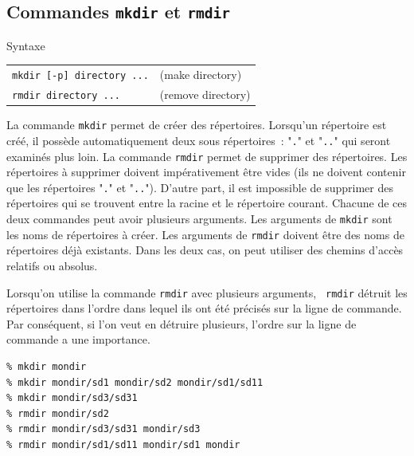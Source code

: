\subsection{Commandes {\tt mkdir} et {\tt rmdir}}

\begin{definition}{Syntaxe}
\begin{tabular}{ll}
	\index{mkdir@\texttt{mkdir}}\verb=mkdir [-p] directory ...=	& (make directory) \\
	\index{rmdir@\texttt{rmdir}}\verb=rmdir directory ...=		& (remove directory)\\
\end{tabular}
\end{definition}

La commande {\tt mkdir} permet de cr{\'e}er des r{\'e}pertoires. Lorsqu'un
r{\'e}pertoire est cr{\'e}{\'e}, il poss{\`e}de automatiquement deux sous r{\'e}pertoires~:
"{\tt .}" et "{\tt ..}" qui seront examin{\'e}s plus loin. La commande
{\tt rmdir} permet de supprimer des r{\'e}pertoires. Les r{\'e}pertoires {\`a} supprimer
doivent imp{\'e}rativement {\^e}tre vides (ils ne doivent contenir que les
r{\'e}pertoires "{\tt .}" et "{\tt ..}"). D'autre part, il est
impossible de supprimer des r{\'e}pertoires qui se trouvent entre la racine
et le r{\'e}pertoire courant. Chacune de ces deux commandes peut avoir
plusieurs arguments. Les arguments de {\tt mkdir} sont les noms de r{\'e}pertoires
{\`a} cr{\'e}er. Les arguments de {\tt rmdir} doivent {\^e}tre des noms de r{\'e}pertoires
d{\'e}j{\`a} existants. Dans les deux cas, on peut utiliser des chemins d'acc{\`e}s
relatifs ou absolus.

\begin{remarque}
Lorsqu'on utilise la commande {\tt rmdir} avec plusieurs arguments, {\tt
rmdir} d{\'e}truit les r{\'e}pertoires dans l'ordre dans lequel ils ont {\'e}t{\'e}
pr{\'e}cis{\'e}s sur la ligne de commande. Par cons{\'e}quent, si l'on veut en
d{\'e}truire plusieurs, l'ordre sur la ligne de commande a une importance.
\end{remarque}

\begin{example}
\begin{verbatim}
% mkdir mondir
% mkdir mondir/sd1 mondir/sd2 mondir/sd1/sd11
% mkdir mondir/sd3/sd31
% rmdir mondir/sd2
% rmdir mondir/sd3/sd31 mondir/sd3
% rmdir mondir/sd1/sd11 mondir/sd1 mondir
\end{verbatim}
\end{example}

